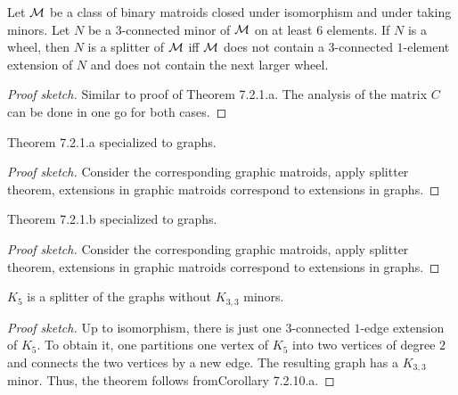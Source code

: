 \begin{theorem}
  \label{thm:7.2.1.b}
  Let $\mathcal{M}$ be a class of binary matroids closed under isomorphism and under taking minors. Let $N$ be a $3$-connected minor of $\mathcal{M}$ on at least $6$ elements.
  If $N$ is a wheel, then $N$ is a splitter of $\mathcal{M}$ iff $\mathcal{M}$ does not contain a $3$-connected $1$-element extension of $N$ and does not contain the next larger wheel.
\end{theorem}

\begin{proof}[Proof sketch]
  Similar to proof of Theorem 7.2.1.a. The analysis of the matrix $C$ can be done in one go for both cases.
\end{proof}

\begin{corollary}[7.2.10.a]
  \label{cor:7.2.10.a}
  Theorem 7.2.1.a specialized to graphs.
\end{corollary}

\begin{proof}[Proof sketch]
  Consider the corresponding graphic matroids, apply splitter theorem, extensions in graphic matroids correspond to extensions in graphs.
\end{proof}

\begin{corollary}[7.2.10.b]
  \label{cor:7.2.10.b}
  Theorem 7.2.1.b specialized to graphs.
\end{corollary}

\begin{proof}[Proof sketch]
  Consider the corresponding graphic matroids, apply splitter theorem, extensions in graphic matroids correspond to extensions in graphs.
\end{proof}

\begin{theorem}[7.2.11.a]
  \label{thm:7.2.11.a}
  $K_{5}$ is a splitter of the graphs without $K_{3,3}$ minors.
\end{theorem}

\begin{proof}[Proof sketch]
  Up to isomorphism, there is just one $3$-connected $1$-edge extension of $K_5$. To obtain it, one partitions one vertex of $K_5$ into two vertices of degree $2$ and connects the two vertices by a new edge. The resulting graph has a $K_{3,3}$ minor. Thus, the theorem follows fromCorollary 7.2.10.a.
\end{proof}

